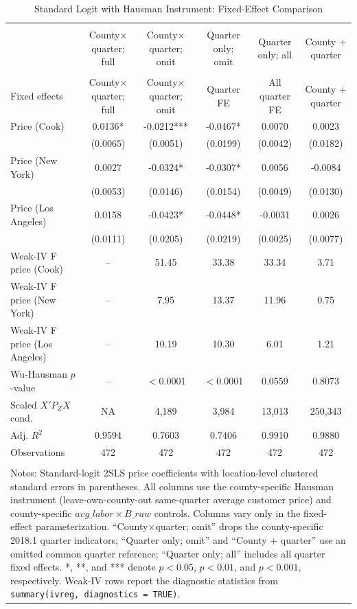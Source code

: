 \begin{table}[!htbp] \centering
  \caption{Standard Logit with Hausman Instrument: Fixed-Effect Comparison}
  \label{tab:standard_hausman_fe_comparison}
  \begin{tabular}{lccccc}
\\[-1.8ex]\hline
\hline \\[-1.8ex]
 & County$\times$quarter; full & County$\times$quarter; omit & Quarter only; omit & Quarter only; all & County + quarter \\
\hline \\[-1.8ex]
Fixed effects & County$\times$quarter; full & County$\times$quarter; omit & Quarter FE & All quarter FE & County + quarter \\
Price (Cook) & 0.0136* & -0.0212*** & -0.0467* & 0.0070 & 0.0023 \\
 & (0.0065) & (0.0051) & (0.0199) & (0.0042) & (0.0182) \\
Price (New York) & 0.0027 & -0.0324* & -0.0307* & 0.0056 & -0.0084 \\
 & (0.0053) & (0.0146) & (0.0154) & (0.0049) & (0.0130) \\
Price (Los Angeles) & 0.0158 & -0.0423* & -0.0448* & -0.0031 & 0.0026 \\
 & (0.0111) & (0.0205) & (0.0219) & (0.0025) & (0.0077) \\
Weak-IV F price (Cook) & -- & 51.45 & 33.38 & 33.34 & 3.71 \\
Weak-IV F price (New York) & -- & 7.95 & 13.37 & 11.96 & 0.75 \\
Weak-IV F price (Los Angeles) & -- & 10.19 & 10.30 & 6.01 & 1.21 \\
Wu-Hausman $p$-value & -- & $<$0.0001 & $<$0.0001 & 0.0559 & 0.8073 \\
Scaled $X'P_ZX$ cond. & NA & 4,189 & 3,984 & 13,013 & 250,343 \\
Adj. $R^2$ & 0.9594 & 0.7603 & 0.7406 & 0.9910 & 0.9880 \\
Observations & 472 & 472 & 472 & 472 & 472 \\
\hline \\[-1.8ex]
\multicolumn{6}{p{0.92\linewidth}}{\footnotesize Notes: Standard-logit 2SLS price coefficients with location-level clustered standard errors in parentheses. All columns use the county-specific Hausman instrument (leave-own-county-out same-quarter average customer price) and county-specific $avg\_labor \times B\_raw$ controls. Columns vary only in the fixed-effect parameterization. ``County$\times$quarter; omit'' drops the county-specific 2018.1 quarter indicators; ``Quarter only; omit'' and ``County + quarter'' use an omitted common quarter reference; ``Quarter only; all'' includes all quarter fixed effects. *, **, and *** denote $p<0.05$, $p<0.01$, and $p<0.001$, respectively. Weak-IV rows report the diagnostic statistics from \texttt{summary(ivreg, diagnostics = TRUE)}.}\\
\end{tabular}
\end{table}
